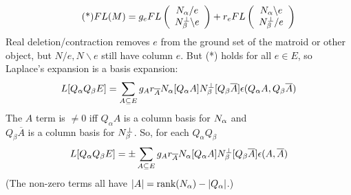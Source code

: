 \documentclass{beamer}
\begin{document}
\begin{frame}
    \begin{equation*}\tag{*}
  FL(M) =
  g_eFL\left(\begin{array}{c} N_{\alpha}/e\\ N_{\beta}^{\perp}\backslash e \end{array} \right)
+
r_eFL\left(\begin{array}{c} N_{\alpha}\backslash e\\ N_{\beta}^{\perp}/e \end{array} \right)
    \end{equation*}
Real deletion/contraction removes $e$ from the ground set of the matroid or other
object, but $N/e,N\backslash e$ still have column $e$.  But (*) holds for all $e\in E$, so
Laplace's expansion is
a basis expansion:
\[
L[Q_\alpha Q_\beta E] = \sum_{A\subseteq E}g_Ar_{\overline{A}}N_{\alpha}[Q_\alpha A]N_{\beta}^{\perp}[Q_\beta\overline{A}]
\epsilon(Q_\alpha A,Q_\beta\overline{A})
\]
The $A$ term is $\neq 0$ iff $Q_\alpha A$ is a column basis for $N_{\alpha}$ and \\
$Q_\beta \overline{A}$ is a column basis for $N_{\beta}^{\perp}$.
So, for each $Q_\alpha Q_\beta $
\[
L[Q_\alpha Q_\beta E] =
\pm\sum_{A\subseteq E}g_Ar_{\overline{A}}N_{\alpha}[Q_\alpha A]N_{\beta}^{\perp}[Q_\beta\overline{A}]
\epsilon(A,\overline{A})
\]
(The non-zero terms all have $|A|=\text{rank}(N_{\alpha})-|Q_\alpha|$.)
\end{frame}
\end{document}
